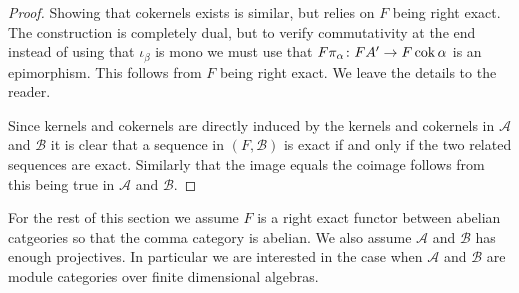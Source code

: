 \begin{prop}
\begin{proof}
		Showing that cokernels exists is similar, but relies on $F$ being right exact. The construction is completely dual, but to verify commutativity at the end instead of using that $\iota_\beta$ is mono we must use that $F\pi_\alpha\colon FA' \to F\operatorname{cok} \alpha$ is an epimorphism. This follows from $F$ being right exact. We leave the details to the reader. 
		
		Since kernels and cokernels are directly induced by the kernels and cokernels in $\mathcal A$ and $\mathcal B$ it is clear that a sequence in $(F, \mathcal B)$ is exact if and only if the two related sequences are exact. Similarly that the image equals the coimage follows from this being true in $\mathcal A$ and $\mathcal B$.
	\end{proof}
\end{prop}

For the rest of this section we assume $F$ is a right exact functor between abelian catgeories so that the comma category is abelian. We also assume $\mathcal A$ and $\mathcal B$ has enough projectives. In particular we are interested in the case when $\mathcal A$ and $\mathcal B$ are module categories over finite dimensional algebras.

